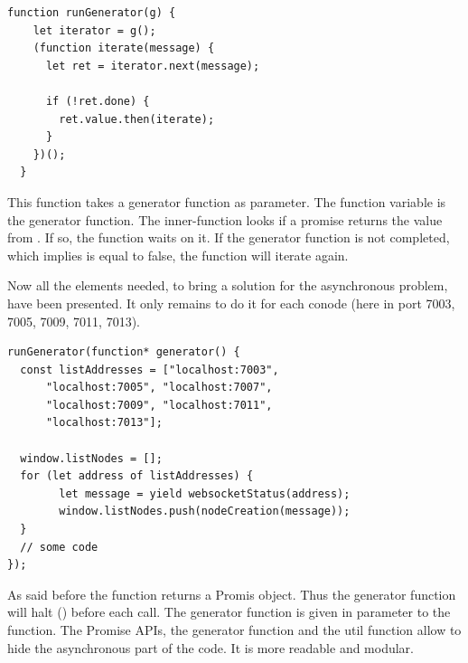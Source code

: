 \documentclass[11pt, a4paper, twoside, openright, openany]{article}
\begin{document}
\begin{lstlisting}[caption={Extract from the project's code~\cite{runGenerator}}, captionpos=b]
  function runGenerator(g) {
    let iterator = g();
    (function iterate(message) {
      let ret = iterator.next(message);

      if (!ret.done) {
        ret.value.then(iterate);
      }
    })();
  }
\end{lstlisting}

This function takes a generator function as parameter. The  function
variable is the generator function. The inner-function  looks if
a promise returns the value  from .
If so, the function waits on it.
\newline
If the generator function is not completed, which implies  is equal to false, the function will iterate again.

Now all the elements needed, to bring a solution for the asynchronous problem, have
been presented. It only remains to do it for each conode (here in port 7003, 7005, 7009, 7011, 7013).
\clearpage

\begin{lstlisting}[caption={Extract from the project's code reaching some conodes}, captionpos=b]
runGenerator(function* generator() {
  const listAddresses = ["localhost:7003",
      "localhost:7005", "localhost:7007",
      "localhost:7009", "localhost:7011",
      "localhost:7013"];

  window.listNodes = [];
  for (let address of listAddresses) {
        let message = yield websocketStatus(address);
        window.listNodes.push(nodeCreation(message));
  }
  // some code
});
\end{lstlisting}

As said before the  function returns a Promis object.
Thus the generator function  will halt () before each
 call.
\newline
The generator function is given in parameter to the  function.
\newline
The Promise APIs, the generator function and the util function  allow
to hide the asynchronous part of the code. It is more readable and modular.
\bigbreak
\end{document}
